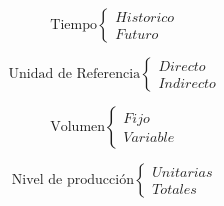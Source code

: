 \[
\text{Tiempo}
\begin{cases}
Historico \\ Futuro
\end{cases}
\]

\[
\text{Unidad de Referencia}
\begin{cases}
Directo \\ Indirecto
\end{cases}
\]

\[
\text{Volumen}
\begin{cases}
Fijo \\ Variable
\end{cases}
\]

\[
\text{Nivel de producción}
\begin{cases}
Unitarias \\ Totales
\end{cases}
\]

